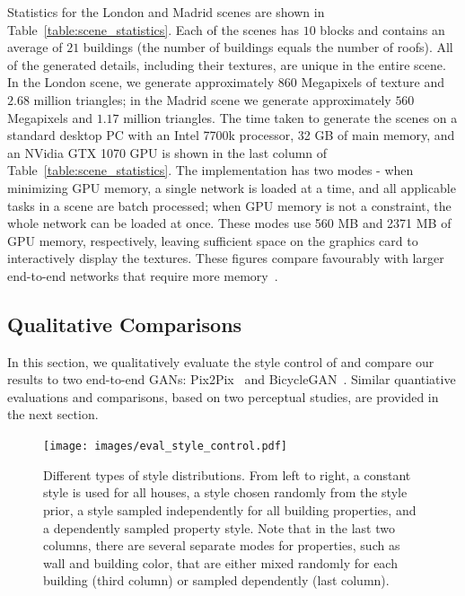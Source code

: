 Statistics for the London and Madrid scenes are shown in Table~\ref{table:scene_statistics}. Each of the scenes has $10$ blocks and contains an average of $21$ buildings (the number of buildings equals the number of roofs). All of the generated details, including their textures, are unique in the entire scene. In the London scene, we generate approximately $860$ Megapixels of texture and $2.68$ million triangles; in the Madrid scene we generate approximately $560$ Megapixels and $1.17$ million triangles. The time taken to generate the scenes on a standard desktop PC with an Intel 7700k processor, 32 GB of main memory, and an NVidia GTX 1070 GPU is shown in the last column of Table~\ref{table:scene_statistics}. The \systemName implementation has two modes - when minimizing GPU memory, a single network is loaded at a time, and all applicable tasks in a scene are batch processed; when GPU memory is not a constraint, the whole network can be loaded at once. These modes use 560 MB and 2371 MB of GPU memory, respectively, leaving sufficient space on the graphics card to interactively display the textures. These figures compare favourably with larger end-to-end networks that require more memory~\cite{Karras:2018:PGG}.


\subsection{Qualitative Comparisons}
\label{sec:qualitative_comparisons}
In this section, we qualitatively evaluate the style control of \systemName and compare our results to two end-to-end GANs: Pix2Pix~\cite{pix2pix} and BicycleGAN~\cite{zhu2017multimodal}. Similar quantiative evaluations and comparisons, based on two perceptual studies, are provided in the next section.

\begin{figure}[t]
    \centering
    \texttt{[image: images/eval\_style\_control.pdf]}
    \caption{Different types of style distributions. From left to right, a constant style is used for all houses, a style chosen randomly from the style prior, a style sampled independently for all building properties, and a dependently sampled property style. Note that in the last two columns, there are several separate modes for properties, such as wall and building color, that are either mixed randomly for each building (third column) or sampled dependently (last column).}
    \label{fig:eval_style_control}
\end{figure}

